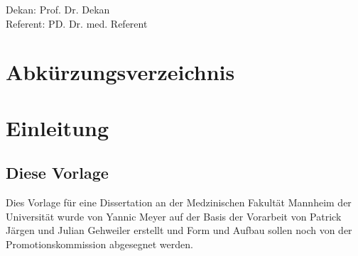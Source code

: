 \documentclass{scrreprt}
\begin{document}
	\thispagestyle{empty}
	\vspace*{\fill}
	\begin{center}
	Dekan: Prof. Dr. Dekan\\
	Referent: PD. Dr. med. Referent
         \end{center}
\tableofcontents
\thispagestyle{empty}

\cleardoubleoddpage%
\pagestyle{scrheadings}


\chapter*{Abkürzungsverzeichnis} 
 \label{sec:abk_Verz}
\begin{acronym}[ABCDE] %
\end{acronym}

\chapter{Einleitung}
\section{Diese Vorlage}
Dies Vorlage für eine Dissertation an der Medzinischen Fakultät Mannheim der Universität wurde von Yannic Meyer auf der Basis der Vorarbeit von Patrick Järgen und Julian Gehweiler erstellt und Form und Aufbau sollen noch von der Promotionskommission abgesegnet werden. 
\end{document}
